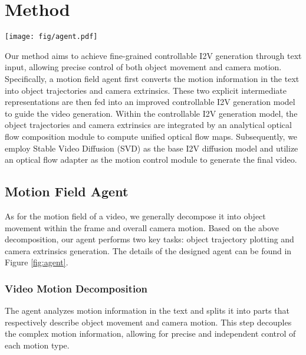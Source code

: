 \section{Method}
\label{sec:method}

\begin{figure*}[t]
\centering
\texttt{[image: fig/agent.pdf]}
\caption{Pipeline of Motion Field Agent. \textbf{Step 1:} The agent first parses the input text, dividing the motion information into two parts that respectively describe object movement and camera motion. \textbf{Step 2:} The agent draws the object trajectories according to the text of object movement. \textbf{Step 3:} The agent directly generates the camera extrinsics based on the text of camera motion.}
\label{fig:agent}
\end{figure*}

Our method aims to achieve fine-grained controllable I2V generation through text input, allowing precise control of both object movement and camera motion. Specifically, a motion field agent first converts the motion information in the text into object trajectories and camera extrinsics. These two explicit intermediate representations are then fed into an improved controllable I2V generation model to guide the video generation. Within the controllable I2V generation model, the object trajectories and camera extrinsics are integrated by an analytical optical flow composition module to compute unified optical flow maps. Subsequently, we employ Stable Video Diffusion (SVD) \cite{blattmann2023stable} as the base I2V diffusion model and utilize an optical flow adapter \cite{niu2024mofa} as the motion control module to generate the final video.

\subsection{Motion Field Agent}
As for the motion field of a video, we generally decompose it into object movement within the frame and overall camera motion. Based on the above decomposition, our agent performs two key tasks: object trajectory plotting and camera extrinsics generation. The details of the designed agent can be found in Figure \ref{fig:agent}.

\subsubsection{Video Motion Decomposition}
The agent analyzes motion information in the text and splits it into parts that respectively describe object movement and camera motion. This step decouples the complex motion information, allowing for precise and independent control of each motion type.

